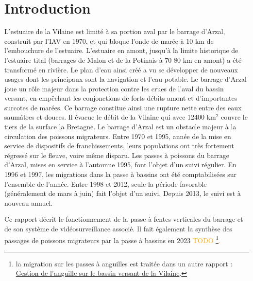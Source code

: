 \documentclass[11pt,twocolumn,titlepage,twoside]{article}\usepackage[]{graphicx}\usepackage[]{color}
\newcommand{\rev}[2][orange]{\textcolor{#1}{#2}}
\begin{document}
  


\tableofcontents






\bigskip



\section*{Introduction}
\label{Introduction}
L'estuaire de la Vilaine est limité à sa portion aval par le barrage d'Arzal,
construit par l'IAV en 1970, et qui bloque l'onde de marée à 10 km de
l'embouchure de l'estuaire.
L'estuaire en amont, jusqu'à la limite historique de l'estuaire tital (barrages de Malon et de la Potinais à 70-80 km en amont) 
a été transformé en rivière. Le plan d'eau ainsi créé a vu se développer de
nouveaux usages dont les principaux sont la navigation et
l'eau potable.
Le barrage d'Arzal joue un rôle majeur dans la protection contre les crues de l'aval du bassin versant, 
en empêchant les conjonctions de
forts débits amont et d'importantes surcotes de marées.
Ce barrage constitue ainsi une rupture nette entre des eaux saumâtres et douces. Il évacue le débit
de la Vilaine qui avec 12400 km$^2$ couvre le tiers de la surface la Bretagne.
Le barrage d'Arzal est un obstacle majeur à la circulation
des poissons migrateurs. Entre 1970 et 1995, année de la mise en service de dispositifs de franchissements,
leurs populations ont très fortement régressé sur le fleuve, voire même disparu.
Les passes à poissons du barrage d'Arzal, mises en service à l'automne 1995, 
font l'objet d'un suivi régulier. En 1996 et 1997, les migrations dans la passe à bassins 
ont été comptabilisées sur l'ensemble de l'année. Entre 1998 et 2012, seule la période favorable 
(généralement de mars à juin) fait l'objet d'un suivi. Depuis 2013, le suivi est à nouveau annuel. 


Ce rapport décrit le fonctionnement de la passe à fentes verticales du barrage
et de son système de vidéosurveillance associé. Il fait également la synthèse des passages de 
poissons migrateurs par la passe à bassins en 2023 \rev{ TODO 
\footnote{la migration sur les passes à anguilles est traitée dans un autre rapport :
\href{https://eptbvilaine56.sharepoint.com/:b:/g/extranet/EcGiQiXYob5AhBZwXXY2zk0B-mRcDpfq8uo0_f-1p4pCoA?e=3I4Nah}{Gestion
de l'anguille sur le bassin versant de la Vilaine}.}.}
\end{document}
